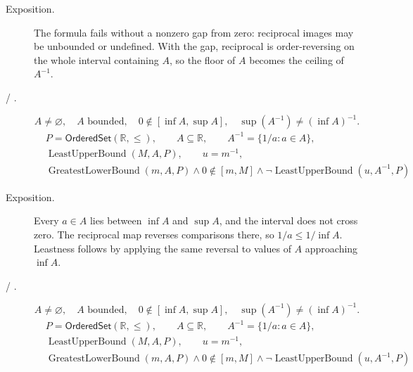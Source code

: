 \begin{remark*}
\begin{description}
  \item[Exposition.]
The formula fails without a nonzero gap from zero: reciprocal images may be
unbounded or undefined.  With the gap, reciprocal is order-reversing on the
whole interval containing $A$, so the floor of $A$ becomes the ceiling of
$A^{-1}$.


  \item[ / .]
  \[
A\neq\varnothing,\quad A\text{ bounded},\quad 0\notin[\inf A,\sup A],
\quad
\sup(A^{-1})\neq(\inf A)^{-1}.
\]
\[
\begin{aligned}
&P=\mathsf{OrderedSet}(\mathbb{R},\leq),\qquad A\subseteq\mathbb{R},\qquad A^{-1}=\{1/a:a\in A\},\\
&\operatorname{LeastUpperBound}(M,A,P),\qquad u=m^{-1},\\
&\operatorname{GreatestLowerBound}(m,A,P)\land 0\notin[m,M]\land
\neg\operatorname{LeastUpperBound}(u,A^{-1},P)
\end{aligned}
\]
\end{description}
\end{remark*}

\begin{remark*}
\begin{description}
  \item[Exposition.]
Every $a\in A$ lies between $\inf A$ and $\sup A$, and the interval does not
cross zero.  The reciprocal map reverses comparisons there, so
$1/a\leq 1/\inf A$.  Leastness follows by applying the same reversal to values
of $A$ approaching $\inf A$.


  \item[ / .]
  \[
A\neq\varnothing,\quad A\text{ bounded},\quad 0\notin[\inf A,\sup A],
\quad
\sup(A^{-1})\neq(\inf A)^{-1}.
\]
\[
\begin{aligned}
&P=\mathsf{OrderedSet}(\mathbb{R},\leq),\qquad A\subseteq\mathbb{R},\qquad A^{-1}=\{1/a:a\in A\},\\
&\operatorname{LeastUpperBound}(M,A,P),\qquad u=m^{-1},\\
&\operatorname{GreatestLowerBound}(m,A,P)\land 0\notin[m,M]\land
\neg\operatorname{LeastUpperBound}(u,A^{-1},P)
\end{aligned}
\]
\end{description}
\end{remark*}

